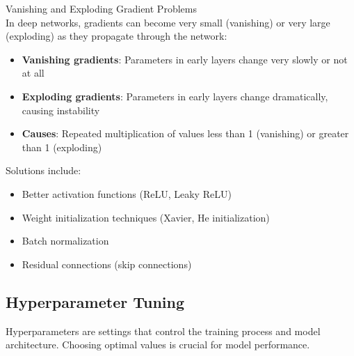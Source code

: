 \begin{concept}{Vanishing and Exploding Gradient Problems}\\
In deep networks, gradients can become very small (vanishing) or very large (exploding) as they propagate through the network:
\begin{itemize}
    \item \textbf{Vanishing gradients}: Parameters in early layers change very slowly or not at all
    \item \textbf{Exploding gradients}: Parameters in early layers change dramatically, causing instability
    \item \textbf{Causes}: Repeated multiplication of values less than 1 (vanishing) or greater than 1 (exploding)
\end{itemize}
Solutions include:
\begin{itemize}
    \item Better activation functions (ReLU, Leaky ReLU)
    \item Weight initialization techniques (Xavier, He initialization)
    \item Batch normalization
    \item Residual connections (skip connections)
\end{itemize}
\end{concept}

\subsection{Hyperparameter Tuning}

Hyperparameters are settings that control the training process and model architecture. Choosing optimal values is crucial for model performance.

